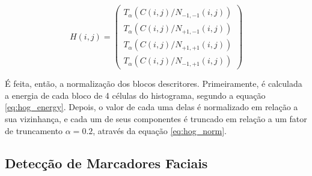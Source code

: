 \begin{equation}\label{eq:hog_norm}
    H(i,j) = \left(\begin{matrix}
        T_\alpha(C(i,j)/N_{-1,-1}(i, j))\\
        T_\alpha(C(i,j)/N_{+1,-1}(i, j))\\
        T_\alpha(C(i,j)/N_{+1,+1}(i, j))\\
        T_\alpha(C(i,j)/N_{-1,+1}(i, j))
    \end{matrix}\right)
\end{equation}

É feita, então, a normalização dos blocos descritores. 
Primeiramente, é calculada a energia de cada bloco de 4 células do histograma, segundo a equação \ref{eq:hog_energy}. 
Depois, o valor de cada uma delas é normalizado em relação a sua vizinhança, e cada um de seus componentes é truncado em relação a um fator de truncamento $\alpha = 0.2$, através da equação \ref{eq:hog_norm}.


\subsection{Detecção de Marcadores Faciais}
\label{sec:faciallm}